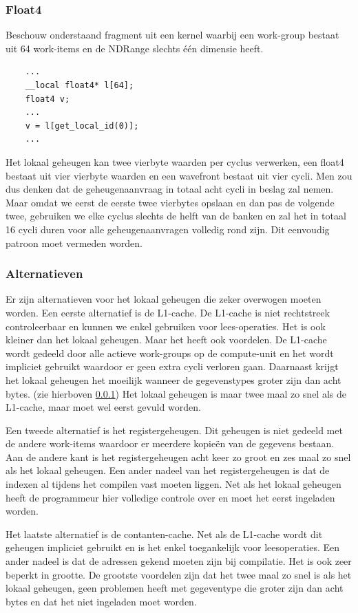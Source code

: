 \subsubsection{Float4}
\label{fl4BankConfl}
Beschouw onderstaand fragment uit een kernel waarbij een work-group bestaat uit 64 work-items en de NDRange slechts \'e\'en dimensie heeft.
\begin{lstlisting}
    ...
    __local float4* l[64];
    float4 v;
    ...
    v = l[get_local_id(0)];
    ...
\end{lstlisting}
Het lokaal geheugen kan twee vierbyte waarden per cyclus verwerken, een float4 bestaat uit vier vierbyte waarden en een wavefront bestaat uit vier cycli. Men zou dus denken dat de geheugenaanvraag in totaal acht cycli in beslag zal nemen. Maar omdat we eerst de eerste twee vierbytes opslaan en dan pas de volgende twee, gebruiken we elke cyclus slechts de helft van de banken en zal het in totaal 16 cycli duren voor alle geheugenaanvragen volledig rond zijn. Dit eenvoudig patroon moet vermeden worden.

\subsubsection{Alternatieven}
Er zijn alternatieven voor het lokaal geheugen die zeker overwogen moeten worden. Een eerste alternatief is de L1-cache. De L1-cache is niet rechtstreek controleerbaar en kunnen we enkel gebruiken voor lees-operaties. Het is ook kleiner dan het lokaal geheugen. Maar het heeft ook voordelen. De L1-cache wordt gedeeld door alle actieve work-groups op de compute-unit en het wordt impliciet gebruikt waardoor er geen extra cycli verloren gaan. Daarnaast krijgt het lokaal geheugen het moeilijk wanneer de gegevenstypes groter zijn dan acht bytes. (zie hierboven \ref{fl4BankConfl}) Het lokaal geheugen is maar twee maal zo snel als de L1-cache, maar moet wel eerst gevuld worden.

Een tweede alternatief is het registergeheugen. Dit geheugen is niet gedeeld met de andere work-items waardoor er meerdere kopie\"en van de gegevens bestaan. Aan de andere kant is het registergeheugen acht keer zo groot en zes maal zo snel als het lokaal geheugen. Een ander nadeel van het registergeheugen is dat de indexen al tijdens het compilen vast moeten liggen. Net als het lokaal geheugen heeft de programmeur hier volledige controle over en moet het eerst ingeladen worden.

Het laatste alternatief is de contanten-cache. Net als de L1-cache wordt dit geheugen impliciet gebruikt en is het enkel toegankelijk voor leesoperaties. Een ander nadeel is dat de adressen gekend moeten zijn bij compilatie. Het is ook zeer beperkt in grootte. De grootste voordelen zijn dat het twee maal zo snel is als het lokaal geheugen, geen problemen heeft met gegeventype die groter zijn dan acht bytes en dat het niet ingeladen moet worden.